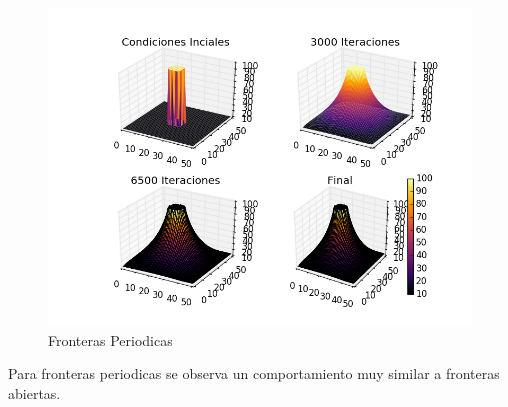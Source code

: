 \documentclass{article}
\begin{document}
\begin{figure}[h]
\centering
\includegraphics[scale=0.9]{Periodicas.png}
\caption{Fronteras Periodicas}
\label{fig:universe}
\end{figure}
Para fronteras periodicas se observa un comportamiento muy similar a fronteras abiertas. 
\end{document}
